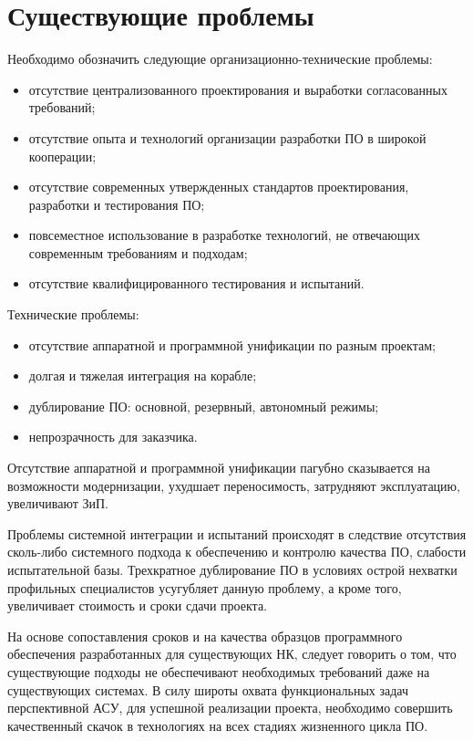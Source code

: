 \documentclass[paper=a4, fontsize=12pt, titlepage=false, twoside=false]{scrartcl}
\begin{document}
\section{Существующие проблемы}

Необходимо обозначить следующие организационно-технические проблемы:
\begin{itemize}
  \item отсутствие централизованного проектирования и выработки согласованных
        требований;
  \item отсутствие опыта и технологий организации разработки ПО в широкой кооперации;
  \item отсутствие современных утвержденных стандартов проектирования, разработки
        и тестирования ПО;
  \item повсеместное использование в разработке технологий, не отвечающих современным
        требованиям и подходам;
  \item отсутствие квалифицированного тестирования и испытаний.
\end{itemize}

Технические проблемы:
\begin{itemize}
 \item отсутствие аппаратной и программной унификации по разным проектам;
 \item долгая и тяжелая интеграция на корабле;
 \item дублирование ПО: основной, резервный, автономный режимы;
 \item непрозрачность для заказчика.
\end{itemize}

Отсутствие аппаратной и программной унификации пагубно сказывается на
возможности модернизации, ухудшает переносимость, затрудняют эксплуатацию,
увеличивают ЗиП.

Проблемы системной интеграции и испытаний происходят в следствие отсутствия
сколь-либо системного подхода к обеспечению и контролю качества ПО,
слабости испытательной базы. Трехкратное дублирование ПО
в условиях острой нехватки профильных специалистов усугубляет
данную проблему, а кроме того, увеличивает стоимость и сроки сдачи проекта.

На основе сопоставления сроков и на качества образцов программного обеспечения
разработанных для существующих НК, следует говорить о том, что существующие подходы
не обеспечивают необходимых требований даже на существующих системах. В силу
широты охвата функциональных задач перспективной АСУ, для успешной реализации
проекта, необходимо совершить качественный скачок в технологиях на всех стадиях
жизненного цикла ПО.
\end{document}
